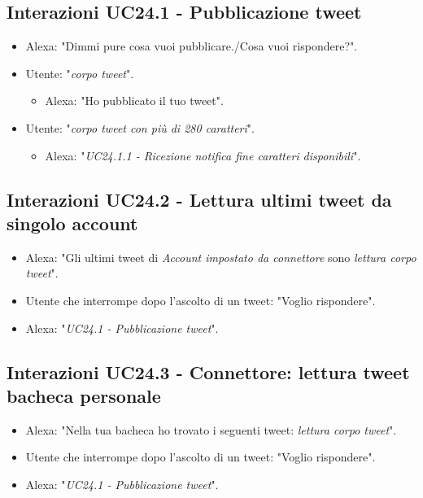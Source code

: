\subsection{Interazioni UC24.1 - Pubblicazione tweet}
\label{sec:connettore_twitter_scrittura}
\begin{itemize}
        \item Alexa: "Dimmi pure cosa vuoi pubblicare./Cosa vuoi rispondere?".
        \item Utente: "{\it corpo tweet}".
        \begin{itemize}
        \item Alexa: "Ho pubblicato il tuo tweet".
           \end{itemize}
        \item Utente: "{\it corpo tweet con più di 280 caratteri}".
           \begin{itemize}
        \item Alexa: "{\it UC24.1.1 - Ricezione notifica fine caratteri disponibili}".
           \end{itemize}
        
    \end{itemize}


\subsection{Interazioni UC24.2 - Lettura ultimi tweet da singolo account}
\label{sec:connettore_twitter_profilo}
 \begin{itemize}
        \item Alexa: "Gli ultimi tweet di {\it Account impostato da connettore} sono {\it lettura corpo tweet}".
        \item Utente che interrompe dopo l'ascolto di un tweet: "Voglio rispondere".
        \item Alexa: "{\it UC24.1 - Pubblicazione tweet}".
    \end{itemize}


\subsection{Interazioni UC24.3 - Connettore: lettura tweet bacheca personale}
\label{sec:connettore_twitter_bacheca}
 \begin{itemize}
        \item Alexa: "Nella tua bacheca ho trovato i seguenti tweet: {\it lettura corpo tweet}".
        \item Utente che interrompe dopo l'ascolto di un tweet: "Voglio rispondere".
        \item Alexa: "{\it UC24.1 - Pubblicazione tweet}".
    \end{itemize}


